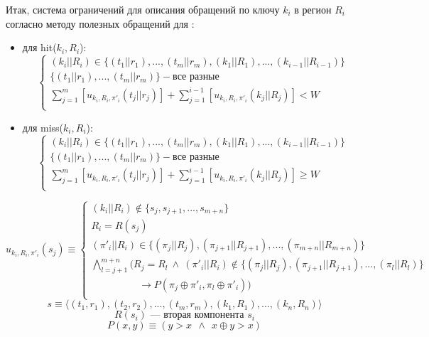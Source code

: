 \begin{enumerate}
Итак, система ограничений для описания обращений по ключу $k_i$ в регион $R_i$ согласно методу полезных обращений для \PseudoLRU:
\begin{itemize}
\item для hit($k_i, R_i$):
$$
\left\{\begin{array}{l}
(k_i||R_i) \in \{(t_1||r_1), ..., (t_m||r_m), (k_1||R_1), ..., (k_{i-1}||R_{i-1})\}\\
\{(t_1||r_1), ..., (t_m||r_m)\} - \mbox{все разные}\\
\sum\limits_{j=1}^m [u_{k_i,R_i,\pi'_i}(t_j||r_j)] + \sum\limits_{j=1}^{i-1} [u_{k_i,R_i,\pi'_i}(k_j||R_j)] < W\\
\end{array} \right.
$$
\item для miss($k_i, R_i$):
$$
\left\{\begin{array}{l}
(k_i||R_i) \in \{(t_1||r_1), ..., (t_m||r_m), (k_1||R_1), ..., (k_{i-1}||R_{i-1})\}\\
\{(t_1||r_1), ..., (t_m||r_m)\} - \mbox{все разные}\\
\sum\limits_{j=1}^m [u_{k_i,R_i,\pi'_i}(t_j||r_j)] + \sum\limits_{j=1}^{i-1} [u_{k_i,R_i,\pi'_i}(k_j||R_j)] \geqslant W\\
\end{array} \right.
$$
\end{itemize}

$$u_{k_i,R_i,\pi'_i} (s_j)  \equiv \left\{\begin{array}{l}
(k_i||R_i) \notin \{s_j, s_{j+1}, ..., s_{m+n}\}\\
R_i = R(s_j)\\
(\pi'_i||R_i) \in \{(\pi_j||R_j), (\pi_{j+1} || R_{j+1}), ..., (\pi_{m+n}||R_{m+n})\}\\
\bigwedge\limits_{l = j+1}^{m+n} (R_j = R_l ~\wedge~(\pi'_i||R_i) \notin \{(\pi_j||R_j), (\pi_{j+1}||R_{j+1}), ..., (\pi_l||R_l)\}\\
 \hspace{2cm} \rightarrow P(\pi_j \oplus \pi'_i, \pi_l \oplus \pi'_i))\\
\end{array}\right.
$$
$$s \equiv \langle (t_1,r_1), (t_2,r_2), ..., (t_m,r_m), (k_1, R_1), ..., (k_n,R_n) \rangle$$
$$R(s_i) \mbox{~--- вторая компонента~} s_i$$
$$P(x, y) \equiv (y > x~~\wedge~~x \oplus y > x)$$




\end{enumerate}
